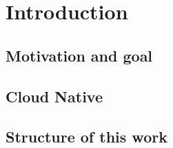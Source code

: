 \chapter{Introduction}

\section{Motivation and goal}

\section{Cloud Native}

\newpage

\section{Structure of this work}

